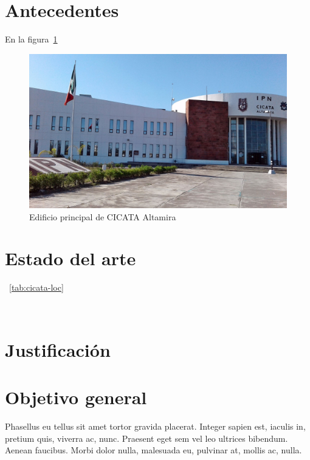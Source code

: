 
\section{Antecedentes} 
    En la figura~\ref{fig:cicata edificio}  \lipsum[1]
    \begin{figure}
       \centering
        \includegraphics[width=1\textwidth]{src/images/cicata-alt-building.jpeg}
        \caption{Edificio principal de CICATA Altamira}
        \label{fig:cicata edificio}
    \end{figure}    

\section{Estado del arte}
    \lipsum[1]~\ref{tab:cicata-loc}

    \lipsum[2]
    

    \cite{garcia2024exploration}~\lipsum[3]


\section{Justificación}
    \lipsum[1]

\section{Objetivo general}
    Phasellus eu tellus sit amet tortor gravida placerat. Integer sapien est, iaculis in, pretium quis, viverra ac, nunc. Praesent eget sem vel leo ultrices bibendum. Aenean faucibus. Morbi dolor nulla, malesuada eu, pulvinar at, mollis ac, nulla. 

